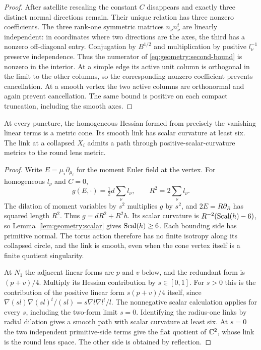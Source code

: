 \begin{proof}
After satellite rescaling the constant $C$ disappears and exactly
three distinct normal directions remain.  Their unique relation
has three nonzero coefficients.  The three rank-one symmetric
matrices $n_\nu n_\nu^t$ are linearly independent: in coordinates
where two directions are the axes, the third has a nonzero
off-diagonal entry.  Conjugation by $B^{1/2}$ and multiplication by
positive $l_\nu^{-1}$ preserve independence.  Thus the numerator
of \eqref{eq:geometry:second-bound} is nonzero in the interior.
At a simple edge its active unit column is orthogonal in the limit
to the other columns, so the corresponding nonzero coefficient
prevents cancellation.  At a smooth vertex the two active columns
are orthonormal and again prevent cancellation.  The same bound
is positive on each compact truncation, including the smooth axes.
\end{proof}

\begin{lemma}
\label{lem:geometry:cones}
At every puncture, the homogeneous Hessian formed from precisely the
vanishing linear terms is a metric cone.  Its smooth link has scalar
curvature at least six.  The link at a collapsed $X_i$ admits a path
through positive-scalar-curvature metrics to the round lens metric.
\end{lemma}

\begin{proof}
Write $E=\mu_i\partial_{\mu_i}$ for the moment Euler field at the
vertex.  For homogeneous $l_\nu$ and $C=0$,
\[
 g(E,\cdot)=\tfrac12 d\sum_\nu l_\nu,\qquad
 R^2=2\sum_\nu l_\nu.
\]
The dilation of moment variables by $s^2$ multiplies $g$ by $s^2$,
and $2E=R\partial_R$ has squared length $R^2$.  Thus
$g=dR^2+R^2h$.  Its scalar curvature is
$R^{-2}(\operatorname{Scal}(h)-6)$, so Lemma~\ref{lem:geometry:scalar} gives
$\operatorname{Scal}(h)\ge6$.  Each bounding side has primitive normal.  The
torus action therefore has no finite isotropy along its collapsed
circle, and the link is smooth, even when the cone vertex itself
is a finite quotient singularity.

At $N_1$ the adjacent linear forms are $p$ and $v$ below, and the
redundant form is $(p+v)/4$.  Multiply its Hessian contribution by
$s\in[0,1]$.  For $s>0$ this is the contribution of the positive
linear form $s(p+v)/4$ itself, since
$\nabla(sl)\nabla(sl)^t/(sl)=s\nabla l\nabla l^t/l$.
The nonnegative scalar calculation applies for every $s$, including
the two-form limit $s=0$.  Identifying the radius-one links by
radial dilation gives a smooth path with scalar curvature at least
six.  At $s=0$ the two independent primitive-side terms give the
flat quotient of $\mathbb C^2$, whose link is the round lens space.  The
other side is obtained by reflection.
\end{proof}

